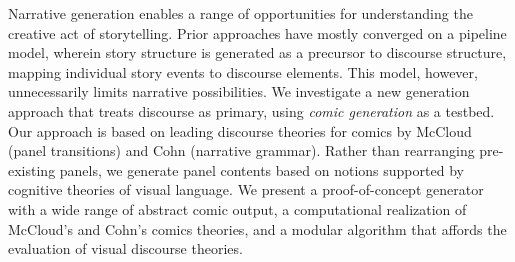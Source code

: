 Narrative generation enables a range of opportunities for understanding the creative act of storytelling.  Prior approaches have mostly converged on a pipeline model, wherein story structure is generated as a precursor to discourse structure, mapping individual story events to discourse elements.  This model, however, unnecessarily limits narrative possibilities.  We investigate a new generation approach that treats discourse as primary, using {\em comic generation} as a testbed.  Our approach is based on leading discourse theories for comics by McCloud (panel transitions) and Cohn (narrative grammar). Rather than rearranging pre-existing panels, we generate panel contents based on notions supported by cognitive theories of visual language.  We present a proof-of-concept generator with a wide range of abstract comic output, a computational realization of McCloud's and Cohn's comics theories, and a modular algorithm that affords the evaluation of visual discourse theories.


